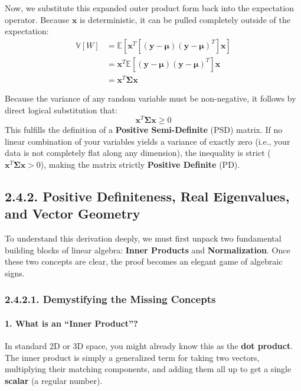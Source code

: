 \documentclass{article}
\begin{document}
Now, we substitute this expanded outer product form back into the expectation operator. Because $\mathbf{x}$ is deterministic, it can be pulled completely outside of the expectation:
\begin{align*}
\mathbb{V}[W] &= \mathbb{E}\left[ \mathbf{x}^T \left[ (\mathbf{y} - \boldsymbol{\mu})(\mathbf{y} - \boldsymbol{\mu})^T \right] \mathbf{x} \right] \\
&= \mathbf{x}^T \mathbb{E}\left[ (\mathbf{y} - \boldsymbol{\mu})(\mathbf{y} - \boldsymbol{\mu})^T \right] \mathbf{x} \\
&= \mathbf{x}^T \boldsymbol{\Sigma} \mathbf{x}
\end{align*}

Because the variance of any random variable must be non-negative, it follows by direct logical substitution that:
\begin{equation*}
\mathbf{x}^T \boldsymbol{\Sigma} \mathbf{x} \ge 0
\end{equation*}
This fulfills the definition of a \textbf{Positive Semi-Definite} (PSD) matrix. If no linear combination of your variables yields a variance of exactly zero (i.e., your data is not completely flat along any dimension), the inequality is strict ($\mathbf{x}^T \boldsymbol{\Sigma} \mathbf{x} > 0$), making the matrix strictly \textbf{Positive Definite} (PD).

\subsection*{2.4.2. Positive Definiteness, Real Eigenvalues, and Vector Geometry}

To understand this derivation deeply, we must first unpack two fundamental building blocks of linear algebra: \textbf{Inner Products} and \textbf{Normalization}. Once these two concepts are clear, the proof becomes an elegant game of algebraic signs.

\subsubsection*{2.4.2.1. Demystifying the Missing Concepts}

\paragraph{1. What is an ``Inner Product''?}
In standard 2D or 3D space, you might already know this as the \textbf{dot product}. The inner product is simply a generalized term for taking two vectors, multiplying their matching components, and adding them all up to get a single \textbf{scalar} (a regular number).
\end{document}
